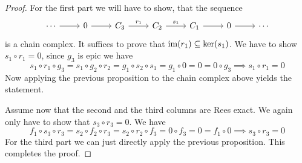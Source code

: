 \begin{proof}[Proof]
    For the first part we will have to show, that the sequence 
    \[\begin{tikzcd}
        \cdots & 0 & {C_3} & {C_2} & {C_1} & 0 & \cdots
        \arrow[from=1-1, to=1-2]
        \arrow[from=1-2, to=1-3]
        \arrow["{r_1}", from=1-3, to=1-4]
        \arrow["{s_1}", from=1-4, to=1-5]
        \arrow[from=1-5, to=1-6]
        \arrow[from=1-6, to=1-7]
    \end{tikzcd}\]
    is a chain complex. It suffices to prove that $\text{im}(r_1)\subseteq\mathrm{ker}(s_1)$.
    We have to show $s_1\circ r_1 = 0$, since $g_3$ is epic we have 
    \[
        s_1\circ r_1\circ g_3 = s_1\circ g_2\circ r_2 = g_1\circ s_2\circ s_1 = g_1 \circ 0 = 0 = 0\circ g_3 \implies s_1\circ r_1 = 0
    \]
    Now applying the previous proposition to the chain complex above yields the statement.\par
    Assume now that the second and the third columns are Rees exact. We again only have to show that 
    $s_3\circ r_3 = 0$. We have 
    \[
    f_1\circ s_3\circ r_3 = s_2 \circ f_2 \circ r_3 = s_2 \circ r_2 \circ f_3 = 0\circ f_3 = 0 = f_1\circ 0 \implies s_3\circ r_3 = 0
    \]
    For the third part we can just directly apply the previous proposition. This completes the proof.
\end{proof}
